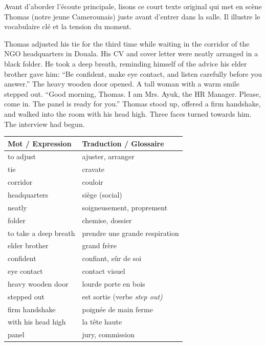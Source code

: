 \documentclass[11pt]{article}
\newcommand{\eng}[1]{\ifmmode\text{\textit{#1}}\else\begingroup\selectlanguage{english}\itshape #1\endgroup\fi}
\begin{document}
Avant d'aborder l'écoute principale, lisons ce court texte original qui met en scène Thomas (notre jeune Camerounais) juste avant d'entrer dans la salle. Il illustre le vocabulaire clé et la tension du moment.

\begin{textebox}
Thomas adjusted his tie for the third time while waiting in the corridor of the NGO headquarters in Douala. His CV and cover letter were neatly arranged in a black folder. He took a deep breath, reminding himself of the advice his elder brother gave him: ``Be confident, make eye contact, and listen carefully before you answer.'' The heavy wooden door opened. A tall woman with a warm smile stepped out. ``Good morning, Thomas. I am Mrs. Ayuk, the HR Manager. Please, come in. The panel is ready for you.'' Thomas stood up, offered a firm handshake, and walked into the room with his head high. Three faces turned towards him. The interview had begun.
\end{textebox}

\begin{center}
\begin{tabularx}{\linewidth}{|l|X|}
\hline
\rowcolor{popblueL} \textbf{Mot / Expression} & \textbf{Traduction / Glossaire} \\ \hline
to adjust & ajuster, arranger \\ \hline
tie & cravate \\ \hline
corridor & couloir \\ \hline
headquarters & siège (social) \\ \hline
neatly & soigneusement, proprement \\ \hline
folder & chemise, dossier \\ \hline
to take a deep breath & prendre une grande respiration \\ \hline
elder brother & grand frère \\ \hline
confident & confiant, sûr de soi \\ \hline
eye contact & contact visuel \\ \hline
heavy wooden door & lourde porte en bois \\ \hline
stepped out & est sortie (verbe \eng{step out}) \\ \hline
firm handshake & poignée de main ferme \\ \hline
with his head high & la tête haute \\ \hline
panel & jury, commission \\ \hline
\end{tabularx}
\end{center}
\end{document}
